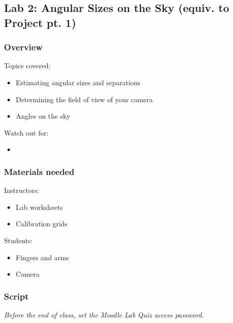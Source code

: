 \documentclass[12pt]{article}
\begin{document}
\newpage
\subsection{Lab 2: Angular Sizes on the Sky (equiv. to Project pt. 1)}

\subsubsection{Overview}

Topics covered:
\begin{itemize}
\item Estimating angular sizes and separations
\item Determining the field of view of your camera
\item Angles on the sky
\end{itemize}

\noindent
Watch out for:
\begin{itemize}
\item 
\end{itemize}


\subsubsection{Materials needed}

Instructors:
\begin{itemize}
\item Lab worksheets
\item Calibration grids
\end{itemize}

\noindent
Students:
\begin{itemize}
\item Fingers and arms
\item Camera
\end{itemize}


\subsubsection{Script}

\renewcommand\slidepath[1]{ppt/lab02/Slide#1.jpeg}

\emph{Before the end of class, set the Moodle Lab Quiz access password.}
\end{document}
